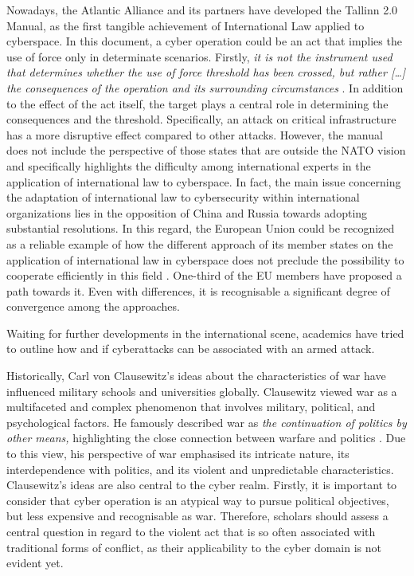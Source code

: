 Nowadays, the Atlantic Alliance and its partners have developed the Tallinn 2.0 Manual, as the first tangible achievement of International Law applied to cyberspace. In this document, a cyber operation could be an act that implies the use of force only in determinate scenarios. Firstly, \textit{it is not the instrument used that determines whether the use of force threshold has been crossed, but rather […] the consequences of the operation and its surrounding circumstances} \autocite[328]{a2017_tallinn}. In addition to the effect of the act itself, the target plays a central role in determining the consequences and the threshold. Specifically, an attack on critical infrastructure has a more disruptive effect compared to other attacks.  However, the manual does not include the perspective of those states that are outside the NATO vision and specifically highlights the difficulty among international experts in the application of international law to cyberspace. In fact, the main issue concerning the adaptation of international law to cybersecurity within international organizations lies in the opposition of China and Russia towards adopting substantial resolutions. In this regard, the European Union could be recognized as a reliable example of how the different approach of its member states on the application of international law in cyberspace does not preclude the possibility to cooperate efficiently in this field \autocite{delerue_2023_toward}. One-third of the EU members have proposed a path towards it. Even with differences, it is recognisable a significant degree of convergence among the approaches. 

Waiting for further developments in the international scene, academics have tried to outline how and if cyberattacks can be associated with an armed attack.

Historically, Carl von Clausewitz’s ideas about the characteristics of war have influenced military schools and universities globally. Clausewitz viewed war as a multifaceted and complex phenomenon that involves military, political, and psychological factors. He famously described war as \textit{the continuation of politics by other means,} highlighting the close connection between warfare and politics  \autocite{carlvonclausewitz_1984_on}. Due to this view, his perspective of war emphasised its intricate nature, its interdependence with politics, and its violent and unpredictable characteristics. Clausewitz’s ideas are also central to the cyber realm. Firstly, it is important to consider that cyber operation is an atypical way to pursue political objectives, but less expensive and recognisable as war. Therefore, scholars should assess a central question in regard to the violent act that is so often associated with traditional forms of conflict, as their applicability to the cyber domain is not evident yet.

